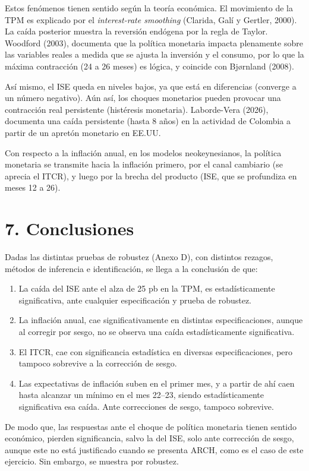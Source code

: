 \documentclass[12pt,letterpaper]{article}
\begin{document}
Estos fenómenos tienen sentido según la teoría económica. El movimiento de la TPM es explicado por el \textit{interest-rate smoothing} (Clarida, Galí y Gertler, 2000). La caída posterior muestra la reversión endógena por la regla de Taylor. Woodford (2003), documenta que la política monetaria impacta plenamente sobre las variables reales a medida que se ajusta la inversión y el consumo, por lo que la máxima contracción (24 a 26 meses) es lógica, y coincide con Bj{\o}rnland (2008).

Así mismo, el ISE queda en niveles bajos, ya que está en diferencias (converge a un número negativo). Aún así, los choques monetarios pueden provocar una contracción real persistente (histéresis monetaria). Laborde-Vera (2026), documenta una caída persistente (hasta 8 años) en la actividad de Colombia a partir de un apretón monetario en EE.UU. 

Con respecto a la inflación anual, en los modelos neokeynesianos, la política monetaria se transmite hacia la inflación primero, por el canal cambiario (se aprecia el ITCR), y luego por la brecha del producto (ISE, que se profundiza en meses 12 a 26).
\section*{7. Conclusiones}

Dadas las distintas pruebas de robustez (Anexo D), con distintos rezagos, métodos de inferencia e identificación, se llega a la conclusión de que:
\begin{enumerate}[label=\arabic*), leftmargin=2em, itemsep=2pt, topsep=4pt]
\item La caída del ISE ante el alza de 25 pb en la TPM, es estadísticamente significativa, ante cualquier especificación y prueba de robustez.
\item La inflación anual, cae significativamente en distintas especificaciones, aunque al corregir por sesgo, no se observa una caída estadísticamente significativa.
\item El ITCR, cae con significancia estadística en diversas especificaciones, pero tampoco sobrevive a la corrección de sesgo.
\item Las expectativas de inflación suben en el primer mes, y a partir de ahí caen hasta alcanzar un mínimo en el mes 22--23, siendo estadísticamente significativa esa caída. Ante correcciones de sesgo, tampoco sobrevive.
\end{enumerate}
De modo que, las respuestas ante el choque de política monetaria tienen sentido económico, pierden significancia, salvo la del ISE, solo ante corrección de sesgo, aunque este no está justificado cuando se presenta ARCH, como es el caso de este ejercicio. Sin embargo, se muestra por robustez.
\end{document}
